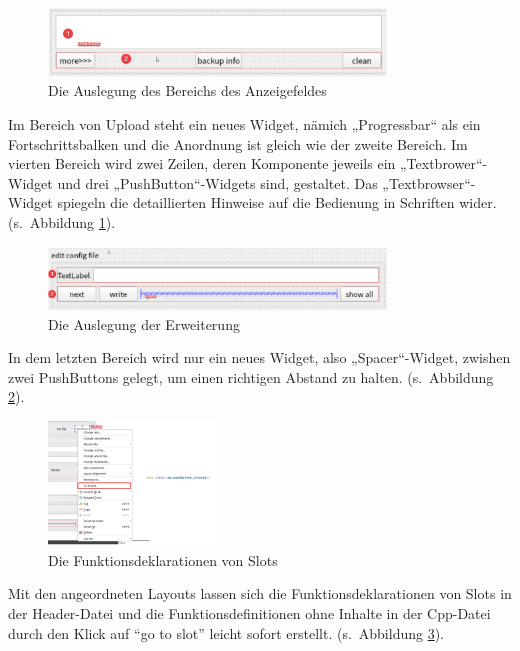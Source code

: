 \begin{figure}[h!]
	\centering
	\includegraphics[width=0.8\textwidth]{bilder/man_info.png}
	\caption{Die Auslegung des Bereichs des Anzeigefeldes }
	\label{Abbildung_13}
\end{figure}
Im Bereich von Upload steht ein neues Widget, nämich „Progressbar“ als ein Fortschrittsbalken und die Anordnung ist gleich wie der zweite Bereich. Im vierten Bereich wird zwei Zeilen, deren Komponente jeweils ein „Textbrower“-Widget und drei „PushButton“-Widgets sind, gestaltet. Das „Textbrowser“-Widget spiegeln die detaillierten Hinweise auf die Bedienung in Schriften wider. (s. Abbildung \ref{Abbildung_13}).

\begin{figure}[h!]
	\centering
	\includegraphics[width=0.8\textwidth]{bilder/man_more.png}
	\caption{Die Auslegung der Erweiterung }
	\label{Abbildung_14}
\end{figure}
In dem letzten Bereich wird nur ein neues Widget, also „Spacer“-Widget, zwishen zwei PushButtons gelegt, um einen richtigen Abstand zu halten.  (s. Abbildung \ref{Abbildung_14}).

\begin{figure}[h!]
	\centering
	\includegraphics[width=0.4\textwidth]{bilder/slot.png}
	\caption{Die Funktionsdeklarationen von Slots }
	\label{Abbildung_15}
\end{figure}
Mit den angeordneten Layouts lassen sich die Funktionsdeklarationen von Slots in der Header-Datei und die Funktionsdefinitionen ohne Inhalte in der Cpp-Datei durch den Klick auf “go to slot” leicht sofort erstellt. (s. Abbildung \ref{Abbildung_15}). 


